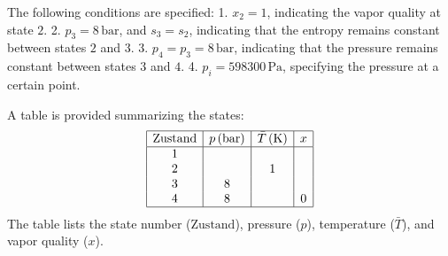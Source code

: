 The following conditions are specified:  
1. \( x_2 = 1 \), indicating the vapor quality at state \( 2 \).  
2. \( p_3 = 8 \, \text{bar} \), and \( s_3 = s_2 \), indicating that the entropy remains constant between states \( 2 \) and \( 3 \).  
3. \( p_4 = p_3 = 8 \, \text{bar} \), indicating that the pressure remains constant between states \( 3 \) and \( 4 \).  
4. \( p_i = 598300 \, \text{Pa} \), specifying the pressure at a certain point.  

A table is provided summarizing the states:  
\[
\begin{array}{|c|c|c|c|}
\hline
\text{Zustand} & p \, (\text{bar}) & \bar{T} \, (\text{K}) & x \\
\hline
1 & & & \\
2 & & 1 & \\
3 & 8 & & \\
4 & 8 & & 0 \\
\hline
\end{array}
\]  
The table lists the state number (\( \text{Zustand} \)), pressure (\( p \)), temperature (\( \bar{T} \)), and vapor quality (\( x \)).
